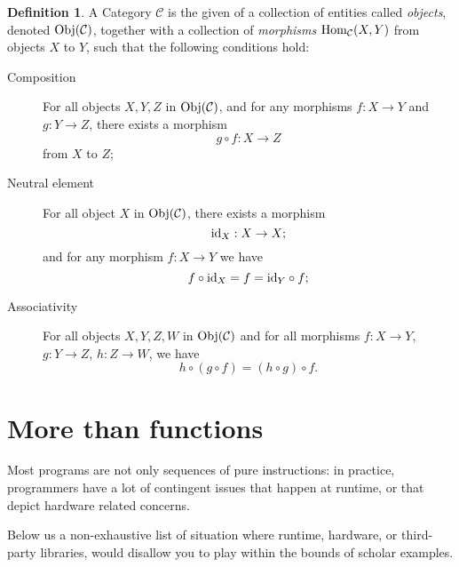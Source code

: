 \documentclass[12pt,a4paper]{report}
\theoremstyle{theorem}
\theoremstyle{definition}
\newtheorem{definition}{Definition}
\begin{document}
\begin{definition}
A Category $\mathcal{C}$ is the given of a collection of entities called
\emph{objects}, denoted ${\rm Obj}(\mathcal{C})$, together with a collection
of \emph{morphisms} ${\rm Hom}_{\mathcal{C}}(X,Y)$
from objects $X$ to $Y$, such that the
following conditions hold:
	\begin{description}
		\item[Composition] For all objects $X,Y,Z$ in ${\rm Obj}(\mathcal{C})$,
		and for any morphisms $f:X\to Y$ and $g:Y\to Z$, there exists a
		morphism
			\[ g\circ f : X\to Z \]
		from $X$ to $Z$;

\begin{center}
\end{center}
		\item[Neutral element] For all object $X$ in ${\rm Obj}(\mathcal{C})$,
		there exists a morphism
			\[ {\rm id}_X : X\to X;\]
		and for any morphism $f:X\to Y$ we have
			\[ f\circ {\rm id}_X = f = {\rm id}_Y \circ f ;\]
		\item[Associativity] For all objects $X,Y,Z,W$ in ${\rm Obj}(\mathcal{C})$
		and for all morphisms $f:X\to Y$, $g:Y\to Z$, $h:Z\to W$,
		we have
			\[ h\circ (g\circ f) = (h\circ g)\circ f .\]
	\end{description}
\end{definition}

\section{More than functions}

Most programs are not
only sequences of pure instructions:
in practice, programmers have a lot of contingent issues that happen
at runtime, or that depict hardware related concerns.

Below us a non-exhaustive list of situation where runtime, hardware,
or third-party libraries, would disallow you
to play within the bounds of scholar examples.
\end{document}
